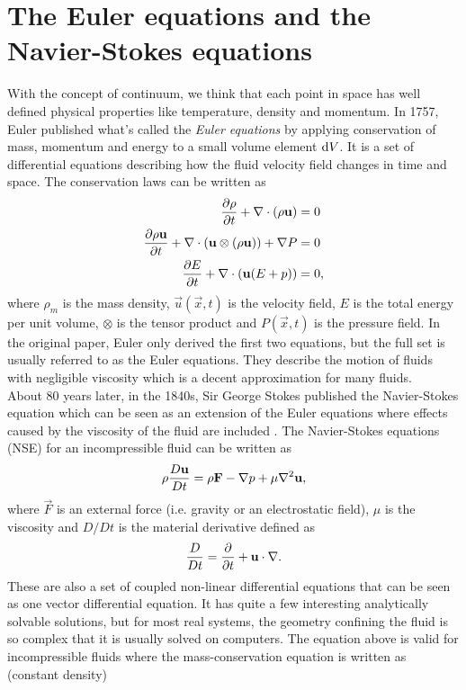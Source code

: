 \section{The Euler equations and the Navier-Stokes equations}
With the concept of continuum, we think that each point in space has well defined physical properties like temperature, density and momentum. In 1757, Euler published what's called the \textit{Euler equations} by applying conservation of mass, momentum and energy to a small volume element $\mathrm{d}V$. It is a set of differential equations describing how the fluid velocity field changes in time and space. The conservation laws can be written as
\begin{align}
	\frac{\partial \rho}{\partial t} + \nabla\cdot (\rho\mathbf u) &= 0\\
	\frac{\partial \rho \mathbf u}{\partial t} + \nabla \cdot (\mathbf u \otimes (\rho\mathbf u)) + \nabla P &= 0\\
	\frac{\partial E}{\partial t} + \nabla\cdot (\mathbf u(E + p)) &= 0,
\end{align}
where $\rho_m$ is the mass density, $\vec u(\vec x, t)$ is the velocity field, $E$ is the total energy per unit volume, $\otimes$ is the tensor product and $P(\vec x, t)$ is the pressure field. In the original paper, Euler only derived the first two equations, but the full set is usually referred to as the Euler equations. They describe the motion of fluids with negligible viscosity which is a decent approximation for many fluids.\\
About 80 years later, in the 1840s, Sir George Stokes published the Navier-Stokes equation which can be seen as an extension of the Euler equations where effects caused by the viscosity of the fluid are included \cite{batchelor2000introduction}. The Navier-Stokes equations (NSE) for an incompressible fluid can be written as
\begin{align}
	\label{eq:nse_incompressible}
	\rho {D\vec u\over Dt} = \rho \vec F - \nabla p + \mu\nabla^2\vec u,
\end{align}
where $\vec F$ is an external force (i.e. gravity or an electrostatic field), $\mu$ is the viscosity and $D/Dt$ is the material derivative defined as
\begin{align}
	{D\over Dt} = \frac{\partial }{\partial t} + \mathbf u\cdot \nabla.
\end{align}
These are also a set of coupled non-linear differential equations that can be seen as one vector differential equation. It has quite a few interesting analytically solvable solutions, but for most real systems, the geometry confining the fluid is so complex that it is usually solved on computers. The equation above is valid for incompressible fluids where the mass-conservation equation is written as (constant density)

